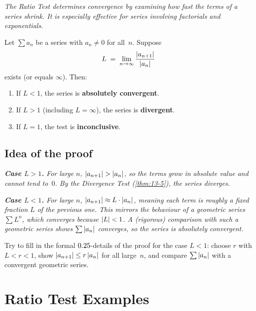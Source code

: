 \textit{The Ratio Test determines convergence by examining how fast the terms of a series shrink.  It is especially effective for series involving factorials and exponentials.}

\begin{theorem}
\label{thm:13-16}
Let $\sum a_{n}$ be a series with $a_{n}\neq 0$ for all~$n$.  Suppose
\[
  L \;=\; \lim_{n\to\infty}\frac{\left\lvert a_{n+1} \right\rvert}{\left\lvert a_{n} \right\rvert}
\]
exists (or equals $\infty$).  Then:
\begin{enumerate}[label=(\roman*)]
  \item If $L<1$, the series is \textbf{absolutely convergent}.
  \item If $L>1$ \textup{(}including $L=\infty$\textup{)}, the series is \textbf{divergent}.
  \item If $L=1$, the test is \textbf{inconclusive}.
\end{enumerate}
\end{theorem}

\subsection*{Idea of the proof}

\textit{\textbf{Case $L>1$.}  For large $n$, $\left\lvert a_{n+1} \right\rvert>\left\lvert a_{n} \right\rvert$, so the terms grow in absolute value and cannot tend to~$0$.  By the Divergence Test (\cref{thm:13-5}), the series diverges.}

\textit{\textbf{Case $L<1$.}  For large $n$, $\left\lvert a_{n+1} \right\rvert\approx L\cdot\left\lvert a_{n} \right\rvert$, meaning each term is roughly a fixed fraction $L$ of the previous one.  This mirrors the behaviour of a geometric series $\sum L^{n}$, which converges because $\left\lvert L \right\rvert<1$.  A (rigorous) comparison with such a geometric series shows $\sum\left\lvert a_{n} \right\rvert$ converges, so the series is absolutely convergent.}

\begin{remark}
Try to fill in the formal $0.25$-details of the proof for the case $L<1$: choose $r$ with $L<r<1$, show $\left\lvert a_{n+1} \right\rvert\le r\left\lvert a_{n} \right\rvert$ for all large~$n$, and compare $\sum\left\lvert a_{n} \right\rvert$ with a convergent geometric series.
\end{remark}

\section{Ratio Test Examples}
\label{sec:13.19}

